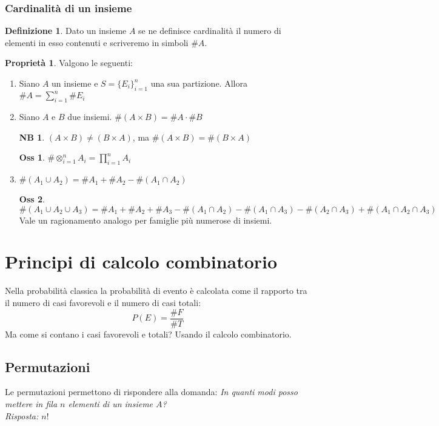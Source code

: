 \documentclass[12pt, a4paper]{report}
\theoremstyle{definition}
\newtheorem{definition}{Definizione}[section]
\newtheorem*{observation}{Oss}
\newtheorem*{property}{Proprietà}
\newtheorem*{note}{NB}
\begin{document}
\subsection{Cardinalità di un insieme}
\begin{definition}
	Dato un insieme $A$ se ne definisce cardinalità il numero di elementi
	in esso contenuti e scriveremo in simboli $\#A$.
\end{definition}
\begin{property}
	Valgono le seguenti:
	\begin{enumerate}
		\item Siano $A$ un insieme e \(S=\{E_i\}_{i=1}^n\) una sua partizione.
		Allora \(\#A = \sum_{i=1}^{n}\#E_i\)
		\item Siano $A$ e $B$ due insiemi. \(\#(A\times B) = \#A \cdot  \#B\)
		\begin{note}
			\((A\times B)\neq (B\times A)\), ma \(\#(A\times B) = \#(B\times A)\)
		\end{note}
		\begin{observation}
			\(\# \otimes_{i=1}^n A_i=\prod_{i=1}^n A_i\)
		\end{observation}
		\item \(\#(A_1\cup A_2) = \#A_1 + \#A_2 - \#(A_1\cap A_2)\)
		\begin{observation}
			\(\#(A_1\cup A_2\cup A_3) = \#A_1 + \#A_2 + \#A_3 - \#(A_1\cap A_2)
			- \#(A_1\cap A_3) - \#(A_2\cap A_3) + \#(A_1\cap A_2\cap A_3)\)
			\\Vale un ragionamento analogo per famiglie più numerose di insiemi.
		\end{observation}
	\end{enumerate}
\end{property}

\chapter{Principi di calcolo combinatorio}

Nella probabilità classica la probabilità di evento è calcolata come il rapporto
tra il numero di casi favorevoli e il numero di casi totali:
\[ P(E) = \frac{\#F}{\#T} \]
Ma come si contano i casi favorevoli e totali? Usando il calcolo combinatorio.

\section{Permutazioni}
Le permutazioni permettono di rispondere alla domanda: \textit{In quanti modi
posso mettere in fila $n$ elementi di un insieme $A$?}
\\\textit{Risposta: $n!$}
\end{document}

